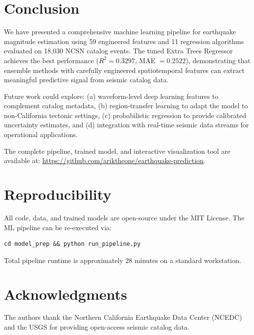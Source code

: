 \documentclass[journal,10pt,twocolumn]{IEEEtran}
\begin{document}
\section{Conclusion}
\label{sec:conclusion}

We have presented a comprehensive machine learning pipeline for earthquake magnitude estimation using 59 engineered features and 11 regression algorithms evaluated on 18,030 NCSN catalog events. The tuned Extra Trees Regressor achieves the best performance ($R^2 = 0.3297$, MAE $= 0.2522$), demonstrating that ensemble methods with carefully engineered spatiotemporal features can extract meaningful predictive signal from seismic catalog data.

Future work could explore: (a) waveform-level deep learning features to complement catalog metadata, (b) region-transfer learning to adapt the model to non-California tectonic settings, (c) probabilistic regression to provide calibrated uncertainty estimates, and (d) integration with real-time seismic data streams for operational applications.

The complete pipeline, trained model, and interactive visualization tool are available at: \url{https://github.com/ariktheone/earthquake-prediction}.

\section*{Reproducibility}

All code, data, and trained models are open-source under the MIT License. The ML pipeline can be re-executed via:
\begin{verbatim}
cd model_prep && python run_pipeline.py
\end{verbatim}
Total pipeline runtime is approximately 28 minutes on a standard workstation.

\section*{Acknowledgments}
The authors thank the Northern California Earthquake Data Center (NCEDC) and the USGS for providing open-access seismic catalog data.
\end{document}
